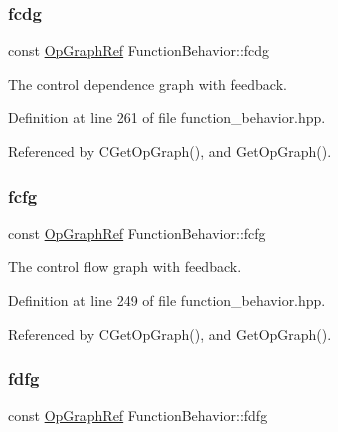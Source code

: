 \mbox{\label{classFunctionBehavior_ace42dfa2365d6c4475382848a7285646}} 
\subsubsection{\texorpdfstring{fcdg}{fcdg}}
{\footnotesize\ttfamily const \hyperlink{op__graph_8hpp_aee97c95c40f791b60c451d9e29c72d39}{Op\+Graph\+Ref} Function\+Behavior\+::fcdg\hspace{0.3cm}{\ttfamily [private]}}



The control dependence graph with feedback. 



Definition at line 261 of file function\+\_\+behavior.\+hpp.



Referenced by C\+Get\+Op\+Graph(), and Get\+Op\+Graph().

\mbox{\label{classFunctionBehavior_afdc849d82c1535e37b89aecbd684cc53}} 
\subsubsection{\texorpdfstring{fcfg}{fcfg}}
{\footnotesize\ttfamily const \hyperlink{op__graph_8hpp_aee97c95c40f791b60c451d9e29c72d39}{Op\+Graph\+Ref} Function\+Behavior\+::fcfg\hspace{0.3cm}{\ttfamily [private]}}



The control flow graph with feedback. 



Definition at line 249 of file function\+\_\+behavior.\+hpp.



Referenced by C\+Get\+Op\+Graph(), and Get\+Op\+Graph().

\mbox{\label{classFunctionBehavior_a2e7529ea5dcdda96e2ea5cfab95abbd1}} 
\subsubsection{\texorpdfstring{fdfg}{fdfg}}
{\footnotesize\ttfamily const \hyperlink{op__graph_8hpp_aee97c95c40f791b60c451d9e29c72d39}{Op\+Graph\+Ref} Function\+Behavior\+::fdfg\hspace{0.3cm}{\ttfamily [private]}}



